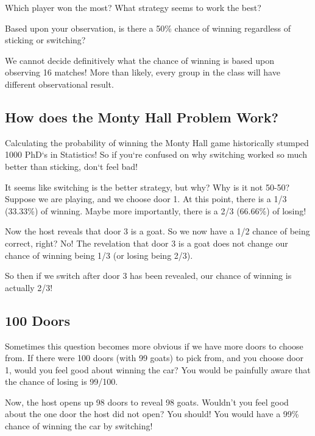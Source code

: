 \begin{exercise}
Which player won the most? What strategy seems to work the best?
\end{exercise}

\blanks

\begin{exercise}
Based upon your observation, is there a 50\% chance of winning regardless of sticking or switching?
\end{exercise}

\blanks

\begin{remark}
We cannot decide definitively what the chance of winning is based upon observing 16 matches! More than likely, every group in the class will have different observational result.
\end{remark}

\subsection{How does the Monty Hall Problem Work?}

Calculating the probability of winning the Monty Hall game historically stumped 1000 PhD`s in Statistics! So if you`re confused on why switching worked so much better than sticking, don`t feel bad!

\noindent It seems like switching is the better strategy, but why? Why is it not 50-50? Suppose we are playing, and we choose door 1. At this point, there is a 1/3 (33.33\%) of winning. Maybe more importantly, there is a 2/3 (66.66\%) of losing!

\noindent Now the host reveals that door 3 is a goat. So we now have a 1/2 chance of being correct, right? No! The revelation that door 3 is a goat does not change our chance of winning being 1/3 (or losing being 2/3).

\noindent So then if we switch after door 3 has been revealed, our chance of winning is actually 2/3!

\subsection{100 Doors}

Sometimes this question becomes more obvious if we have more doors to choose from. If there were 100 doors (with 99 goats) to pick from, and you choose door 1, would you feel good about winning the car? You would be painfully aware that the chance of losing is 99/100.

\noindent Now, the host opens up 98 doors to reveal 98 goats. Wouldn't you feel good about the one door the host did not open? You should! You would have a 99\% chance of winning the car by switching!